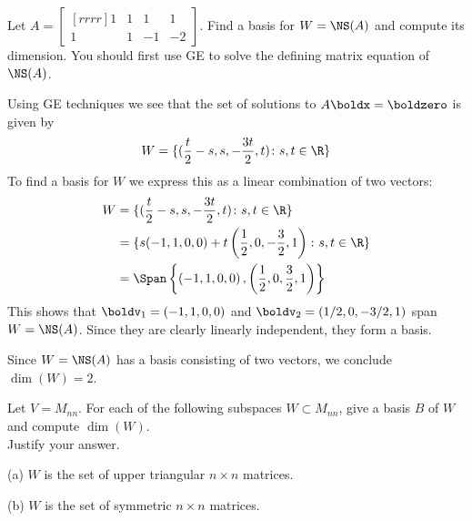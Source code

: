 \ii Let $A=\begin{bmatrix}[rrrr]1&1&1&1\\ 1&1&-1&-2
\end{bmatrix}$. Find a basis for $W=\NS(A)$ and compute its dimension. You should first use GE to solve the defining matrix equation of $\NS(A)$. 
\\
\begin{solution}
\noindent
Using GE techniques we see that the set of solutions to $A\boldx=\boldzero$ is given by 
\[
W=\{(\frac{t}{2}-s ,s, -\frac{3t}{2},t)\colon s,t\in\R\}
\]
To find a basis for $W$ we express this as a linear combination of two vectors:
\begin{align*}
W&=\{(\frac{t}{2}-s ,s, -\frac{3t}{2},t)\colon s,t\in\R\}\\
&=\{s(-1,1,0,0)+t\left(\frac{1}{2},0,-\frac{3}{2},1\right)\colon s,t\in\R\}\\
&=\Span\left\{\left(-1,1,0,0\right),\left(\frac{1}{2},0,\frac{3}{2},1\right)\right\}
\end{align*}
This shows that $\boldv_1=(-1,1,0,0)$ and $\boldv_2=(1/2,0,-3/2,1)$ span $W=\NS(A)$. Since they are clearly linearly independent, they form a basis. 

Since $W=\NS(A)$ has a basis consisting of two vectors, we conclude $\dim(W)=2$. 
\end{solution}
\ii \label{ex:matrixbases} 
Let $V=M_{nn}$. For each of the following subspaces $W\subset M_{nn}$, give a basis $B$ of $W$ and compute $\dim(W)$. 
\\
Justify your answer.

(a) $W$ is the set of upper triangular $n\times n$ matrices.
 
(b) $W$ is the set of symmetric $n\times n$ matrices. 

